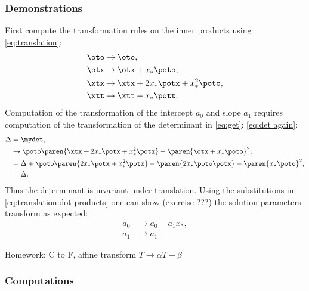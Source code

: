 \subsubsection{Demonstrations}  %
First compute the transformation rules on the inner products using \eqref{eq:translation}:
  \begin{equation}   %
    \begin{split}
      \oto &\rightarrow \oto, \\
      \otx &\rightarrow \otx + x_{*} \poto, \\
      \xtx &\rightarrow \xtx + 2x_{*} \potx + x_{*}^{2} \poto, \\
      \xtt &\rightarrow \xtt + x_{*} \pott.
     \label{eq:translation:dot products}
     \end{split}
  \end{equation}
Computation of the transformation of the intercept $a_{0}$ and slope $a_{1}$ requires computation of the transformation of the determinant in \eqref{eq:get}:
  \eqref{eq:det again}:
  \begin{equation*}   %
    \begin{split}
      \Delta 
        &= \mydet, \\
        &\rightarrow \poto \paren{\xtx + 2x_{*} \potx + x_{*}^{2} \potx} - \paren{\otx + x_{*} \poto}^{2} , \\
        &= \Delta + \poto \paren{2x_{*} \potx + x_{*}^{2} \potx} - \paren{2x_{*} \poto\potx} - \paren{x_{*}\poto}^{2} , \\
        &= \Delta.
    \end{split}
  \end{equation*}
Thus the determinant is invariant under translation. Using the substitutions in \eqref{eq:translation:dot products} one can show (exercise ???) the solution parameters transform as expected:
  \begin{equation*}   %
   \begin{split}
      a_{0} &\rightarrow a_{0} - a_{1} x_{*}, \\
      a_{1} &\rightarrow a_{1} .
   \end{split}
  \end{equation*}

Homework: C to F, affine transform $T\rightarrow \alpha T + \beta$


\subsubsection{Computations}  %

